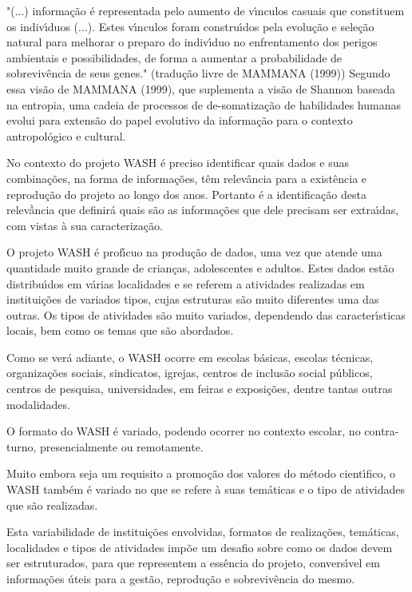\documentclass[
12pt,		%
openright,	%
twoside,  %
a4paper,			%
chapter=TITLE,		%
english,			%
french,				%
spanish,			%
brazil				%
]{USPSC-classe/USPSC}
\begin{document}
"(...) informa\c{c}\~ao \'e representada pelo aumento de v\'{\i}nculos casuais que constituem os indiv\'{\i}duos (...). Estes v\'{\i}nculos foram constru\'{\i}dos pela evolu\c{c}\~ao e sele\c{c}\~ao natural para melhorar o preparo do indiv\'{\i}duo no enfrentamento dos perigos ambientais e possibilidades, de forma a aumentar a probabilidade de sobreviv\^encia de seus genes." (tradu\c{c}\~ao livre de  MAMMANA (1999))
Segundo essa vis\~ao de  MAMMANA (1999), que suplementa a vis\~ao de Shannon baseada na entropia, uma cadeia de processos de de-somatiza\c{c}\~ao de habilidades humanas evolui para extens\~ao do papel evolutivo da informa\c{c}\~ao para o contexto antropol\'ogico e cultural.


No contexto do projeto WASH \'e preciso identificar quais dados e suas combina\c{c}\~oes, na forma de informa\c{c}\~oes, t\^em relev\^ancia para a exist\^encia e reprodu\c{c}\~ao do projeto ao longo dos anos. Portanto \'e a identifica\c{c}\~ao desta relevầncia que definir\'a quais s\~ao as informa\c{c}\~oes que dele precisam ser extra\'{\i}das, com vistas \`a sua caracteriza\c{c}\~ao.


O projeto WASH \'e prof\'{\i}cuo na produ\c{c}\~ao de dados, uma vez que atende uma quantidade muito grande de crian\c{c}as, adolescentes e adultos. Estes dados est\~ao distribu\'{\i}dos em v\'arias localidades e se referem a atividades realizadas em institui\c{c}\~oes de variados tipos, cujas estruturas s\~ao muito diferentes uma das outras. Os tipos de atividades s\~ao muito variados, dependendo das caracter\'{\i}sticas locais, bem como os temas que s\~ao abordados.


Como se ver\'a adiante, o WASH ocorre  em escolas b\'asicas, escolas t\'ecnicas, organiza\c{c}\~oes sociais, sindicatos, igrejas, centros de inclus\~ao social p\'ublicos, centros de pesquisa, universidades, em feiras e exposi\c{c}\~oes, dentre tantas outras modalidades.


O formato do WASH \'e variado, podendo ocorrer no contexto escolar, no contra-turno, presencialmente ou remotamente.


Muito embora seja um requisito a promo\c{c}\~ao dos valores do m\'etodo cient\'{\i}fico, o WASH tamb\'em \'e variado no que se refere \`a suas tem\'aticas e o tipo de atividades que s\~ao realizadas.


Esta variabilidade de institui\c{c}\~oes envolvidas, formatos de realiza\c{c}\~oes, tem\'aticas, localidades e tipos de atividades imp\~oe um desafio sobre como os dados devem ser estruturados, para que representem a ess\^encia do projeto, convers\'{\i}vel em informa\c{c}\~oes \'uteis para a gest\~ao, reprodu\c{c}\~ao e sobreviv\^encia do mesmo.
\end{document}
